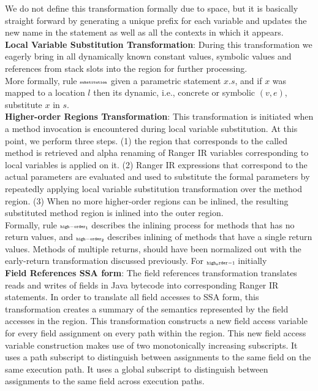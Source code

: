 We do not define this transformation formally due to space, but it is basically straight forward by generating a unique prefix for each variable and updates the new name in the statement as well as all the contexts in which it appears.  \\
%
\textbf{Local Variable Substitution Transformation}: During this transformation we eagerly bring in all dynamically
known constant values, symbolic values and references from stack slots into the region for further processing. \\
More formally, rule $\scriptscriptstyle\mathtt{substitution}$ given a parametric statement $x.s$, and if $x$ was mapped to a location $l$ then its dynamic, i.e., concrete or symbolic $(v, e)$, substitute $x$ in $s$.\\
%
\textbf{Higher-order Regions Transformation}: This transformation is initiated when a method invocation is encountered
during local variable substitution.
%
At this point, we perform three steps.
%
(1) the region that corresponds to the called method is retrieved and alpha renaming of
Ranger IR variables corresponding to local variables is applied on it.
%
(2) Ranger IR expressions that correspond to the actual parameters are evaluated and used to substitute the formal
parameters by repeatedly applying local variable substitution transformation over the method region.
%
(3) When no more higher-order regions can be inlined, the resulting substituted method region is inlined into
the outer region.\\
%
Formally, rule $\scriptscriptstyle\mathtt{high-order_1}$ describes the inlining process for methods that has no return values, and $\scriptscriptstyle\mathtt{high-order_2}$ describes inlining of methods that have a single return values. Methods of multiple returns, should have been normalized out with the early-return transformation discussed previously. For $\scriptscriptstyle\mathtt{high_order-1}$ initially 
\\
\textbf{Field References SSA form}: The field references transformation translates reads and writes of fields
in Java bytecode into corresponding Ranger IR statements.
%
In order to translate all field accesses to SSA form, this transformation creates a summary of the semantics
represented by the field accesses in the region.
%
This transformation constructs a new field access variable for every field assignment on every path within the region.
%
This new field access variable construction makes use of two monotonically increasing subscripts.
%
It uses a path subscript to distinguish between assignments to the same field on the same execution path.
%
It uses a global subscript to distinguish between assignments to the same field across execution paths.
